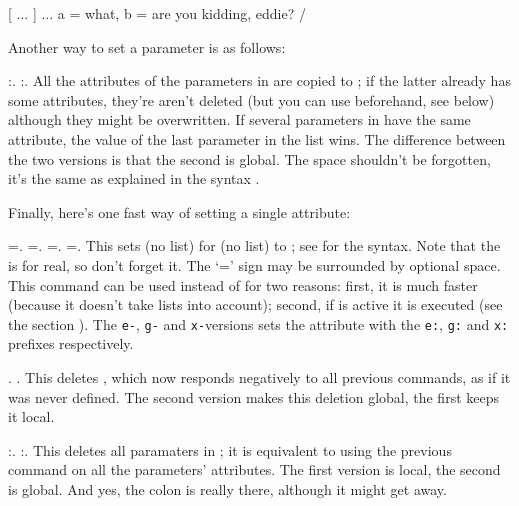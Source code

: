 \example
\def\dosomething#1{ ... #1 ... }
[\dosomething]{a = what, b = are you kidding, eddie?}
\example/

Another way to set a parameter is as follows:

\describe*\copyparameter\paralist:\param{}.
\describe\gcopyparameter\paralist:\param{}.
All the attributes of the parameters in \paralist are copied
to \param; if the latter already has some attributes, they're
aren't deleted (but you can use \com\deleteparameter beforehand,
see below) although they might be overwritten. If several parameters
in \paralist have the same attribute, the value of the last parameter
in the list wins. The difference between the two versions is that
the second is global. The space shouldn't be forgotten, it's the
same as explained in the \paramatt syntax .


Finally, here's one fast way of setting a single attribute:

\describe*\setattribute\paramatt=\value{}.
\describe\esetattribute\paramatt=\value{}.
\describe\gsetattribute\paramatt=\value{}.
\describe\xsetattribute\paramatt=\value{}.
This sets \attr (no list) for \param (no list) to \value; see
 for the \paramatt syntax. Note that the  is for real,
so don't forget it. The `=' sign may be surrounded by optional space.
This command can be used instead of \com\setparameter for two reasons:
first, it is much faster (because it doesn't take lists into account);
second, if \param is active it is  executed (see the section
).
The \verb"e-", \verb"g-" and \verb"x-"versions sets the attribute
with the \verb"e:", \verb"g:" and \verb"x:" prefixes respectively.

\describe*\deleteattribute\paramatt.
\describe\gdeleteattribute\paramatt.
This deletes \paramatt, which now responds negatively
to all previous commands, as if it was never defined.
The second version makes this deletion global, the first
keeps it local.

\describe*\deleteparameter\paralist:.
\describe\gdeleteparameter\paralist:.
This deletes all paramaters in \paralist; it is equivalent to using
the previous command on all the parameters' attributes. The
first version is local, the second is global. And yes, the colon is
really there, although it might get away.



